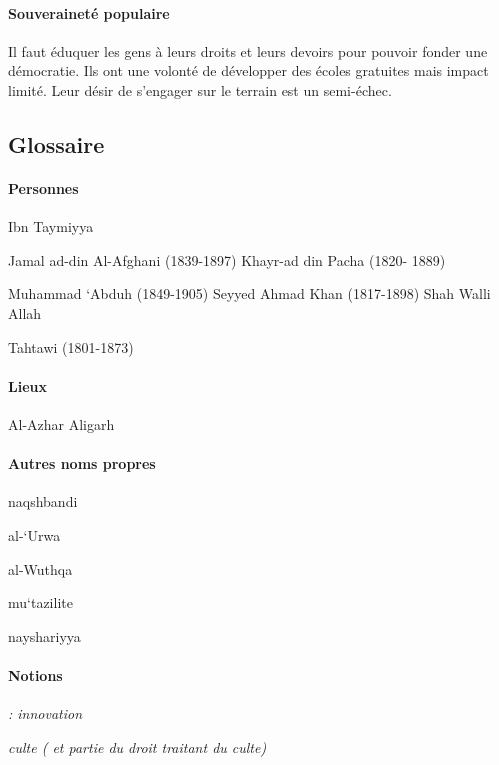 \paragraph{Souveraineté populaire} Il faut éduquer les gens à leurs droits et leurs devoirs pour pouvoir fonder une démocratie. Ils ont une volonté de développer des écoles gratuites mais impact limité. Leur désir de s'engager sur le terrain est un semi-échec.


\hypertarget{glossaire-2}{%
\subsection{\texorpdfstring{{Glossaire}}{Glossaire}}\label{glossaire-2}}


\paragraph{Personnes}

Ibn Taymiyya

Jamal ad-din Al-Afghani (1839-1897) Khayr-ad din Pacha (1820- 1889)

Muhammad `Abduh (1849-1905) Seyyed Ahmad Khan (1817-1898) Shah Walli
Allah

Tahtawi (1801-1873)

\paragraph{Lieux}

Al-Azhar Aligarh

\paragraph{Autres noms propres}

naqshbandi

al-`Urwa

al-Wuthqa

mu`tazilite

nayshariyya

\paragraph{Notions}

\begin{Def}
\emph{: innovation}
\end{Def} 

\begin{Def}

 \emph{ culte ( et partie du droit traitant du culte)}
\end{Def} 
 

